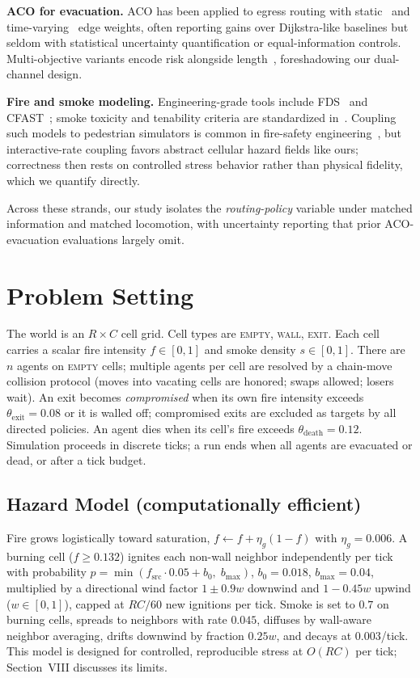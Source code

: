 \documentclass[conference]{IEEEtran}
\begin{document}
\textbf{ACO for evacuation.} ACO has been applied to egress routing with static~\cite{liu2016aco,yanuary2023aco} and time-varying~\cite{wang2020dynamicaco} edge weights, often reporting gains over Dijkstra-like baselines but seldom with statistical uncertainty quantification or equal-information controls. Multi-objective variants encode risk alongside length~\cite{duan2020multiaco}, foreshadowing our dual-channel design.

\textbf{Fire and smoke modeling.} Engineering-grade tools include FDS~\cite{mcgrattan2021fds} and CFAST~\cite{peacock2011cfast}; smoke toxicity and tenability criteria are standardized in~\cite{purser2017sfpe}. Coupling such models to pedestrian simulators is common in fire-safety engineering~\cite{kuligowski2005review}, but interactive-rate coupling favors abstract cellular hazard fields like ours; correctness then rests on controlled stress behavior rather than physical fidelity, which we quantify directly.

Across these strands, our study isolates the \emph{routing-policy} variable under matched information and matched locomotion, with uncertainty reporting that prior ACO-evacuation evaluations largely omit.

\section{Problem Setting}
The world is an $R\times C$ cell grid. Cell types are \textsc{empty}, \textsc{wall}, \textsc{exit}. Each cell carries a scalar fire intensity $f\in[0,1]$ and smoke density $s\in[0,1]$. There are $n$ agents on \textsc{empty} cells; multiple agents per cell are resolved by a chain-move collision protocol (moves into vacating cells are honored; swaps allowed; losers wait). An exit becomes \emph{compromised} when its own fire intensity exceeds $\theta_{\mathrm{exit}}{=}0.08$ or it is walled off; compromised exits are excluded as targets by all directed policies. An agent dies when its cell's fire exceeds $\theta_{\mathrm{death}}{=}0.12$. Simulation proceeds in discrete ticks; a run ends when all agents are evacuated or dead, or after a tick budget.

\subsection{Hazard Model (computationally efficient)}
Fire grows logistically toward saturation, $f\!\leftarrow\!f+\eta_g(1{-}f)$ with $\eta_g{=}0.006$. A burning cell ($f\geq0.132$) ignites each non-wall neighbor independently per tick with probability $p=\min(f_{\mathrm{src}}\cdot0.05+b_0,\;b_{\max})$, $b_0{=}0.018$, $b_{\max}{=}0.04$, multiplied by a directional wind factor $1\pm0.9w$ downwind and $1-0.45w$ upwind ($w\in[0,1]$), capped at $RC/60$ new ignitions per tick. Smoke is set to $0.7$ on burning cells, spreads to neighbors with rate $0.045$, diffuses by wall-aware neighbor averaging, drifts downwind by fraction $0.25w$, and decays at $0.003$/tick. This model is designed for controlled, reproducible stress at $O(RC)$ per tick; Section~VIII discusses its limits.
\end{document}
